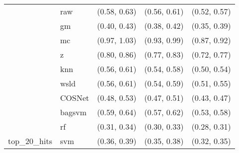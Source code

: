 \begin{table}[H]
{\begin{tabular}{lllll}
 & raw & (0.58, 0.63) & (0.56, 0.61) & (0.52, 0.57)\\

 & gm & (0.40, 0.43) & (0.38, 0.42) & (0.35, 0.39)\\

 & mc & (0.97, 1.03) & (0.93, 0.99) & (0.87, 0.92)\\

 & z & (0.80, 0.86) & (0.77, 0.83) & (0.72, 0.77)\\

 & knn & (0.56, 0.61) & (0.54, 0.58) & (0.50, 0.54)\\

 & wsld & (0.56, 0.61) & (0.54, 0.59) & (0.51, 0.55)\\

 & COSNet & (0.48, 0.53) & (0.47, 0.51) & (0.43, 0.47)\\

 & bagsvm & (0.59, 0.64) & (0.57, 0.62) & (0.53, 0.58)\\

 & rf & (0.31, 0.34) & (0.30, 0.33) & (0.28, 0.31)\\

\multirow{-15}{*}{\raggedright\arraybackslash top\_20\_hits} & svm & (0.36, 0.39) & (0.35, 0.38) & (0.32, 0.35)\\
\bottomrule
\end{tabular}}
\end{table}
